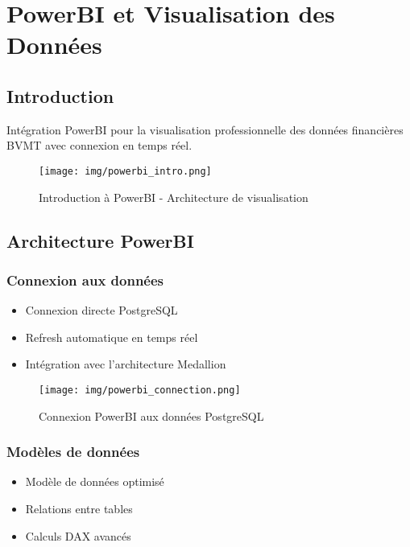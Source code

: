 \section{PowerBI et Visualisation des Données}

\subsection{Introduction}
Intégration PowerBI pour la visualisation professionnelle des données financières BVMT avec connexion en temps réel.

\begin{figure}[H]
    \centering
    \texttt{[image: img/powerbi\_intro.png]}
    \caption{Introduction à PowerBI - Architecture de visualisation}
    \label{fig:powerbi_intro}
\end{figure}

\subsection{Architecture PowerBI}
\subsubsection{Connexion aux données}
\begin{itemize}
    \item Connexion directe PostgreSQL
    \item Refresh automatique en temps réel
    \item Intégration avec l'architecture Medallion
\end{itemize}

\begin{figure}[H]
    \centering
    \texttt{[image: img/powerbi\_connection.png]}
    \caption{Connexion PowerBI aux données PostgreSQL}
    \label{fig:powerbi_connection}
\end{figure}

\subsubsection{Modèles de données}
\begin{itemize}
    \item Modèle de données optimisé
    \item Relations entre tables
    \item Calculs DAX avancés
\end{itemize}

